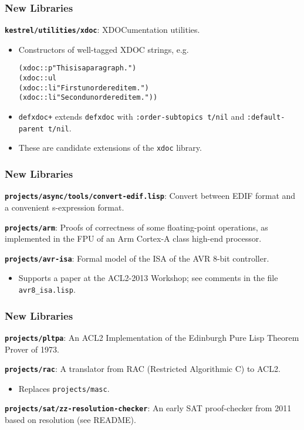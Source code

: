 \documentclass{beamer}
\newcommand{\code}[1]{\texttt{#1}}
\newenvironment{codeblock}{\begin{alltt}}{\end{alltt}}
\newcommand{\bookpath}[1]{\textbf{\code{#1}}}
\newcommand{\newlibtitle}{\frametitle{New Libraries}}
\newcommand{\separation}{\vspace*{1ex}}
\begin{document}
\begin{frame}[fragile]

\newlibtitle

\separation

\bookpath{kestrel/utilities/xdoc}:
XDOCumentation utilities.
\begin{itemize}
\item
Constructors of well-tagged XDOC strings, e.g.
\begin{codeblock}
(xdoc::p "This is a paragraph.")
(xdoc::ul
  (xdoc::li "First unordered item.")
  (xdoc::li "Second unordered item."))
\end{codeblock}
\item
\code{defxdoc+} extends \code{defxdoc} with
\code{:order-subtopics t/nil} and \code{:default-parent t/nil}.
\item
These are candidate extensions of the \code{xdoc} library.
\end{itemize}

\end{frame}


\begin{frame}

\newlibtitle

\bookpath{projects/async/tools/convert-edif.lisp}:
Convert between EDIF format and a convenient s-expression format.

\separation

\bookpath{projects/arm}:
Proofs of correctness of some floating-point operations,
as implemented in the FPU of an Arm Cortex-A class high-end processor.

\separation

\bookpath{projects/avr-isa}:
Formal model of the ISA of the AVR 8-bit controller.
\begin{itemize}
\item
Supports a paper at the ACL2-2013 Workshop;
see comments in the file \code{avr8\_isa.lisp}.
\end{itemize}

\end{frame}


\begin{frame}

\newlibtitle

\bookpath{projects/pltpa}:
An ACL2 Implementation of the Edinburgh Pure Lisp Theorem Prover of 1973.

\separation

\bookpath{projects/rac}:
A translator from RAC (Restricted Algorithmic C) to ACL2.
\begin{itemize}
\item
Replaces \code{projects/masc}.
\end{itemize}

\separation

\bookpath{projects/sat/zz-resolution-checker}:
An early SAT proof-checker from 2011 based on resolution (see README).

\end{frame}
\end{document}

